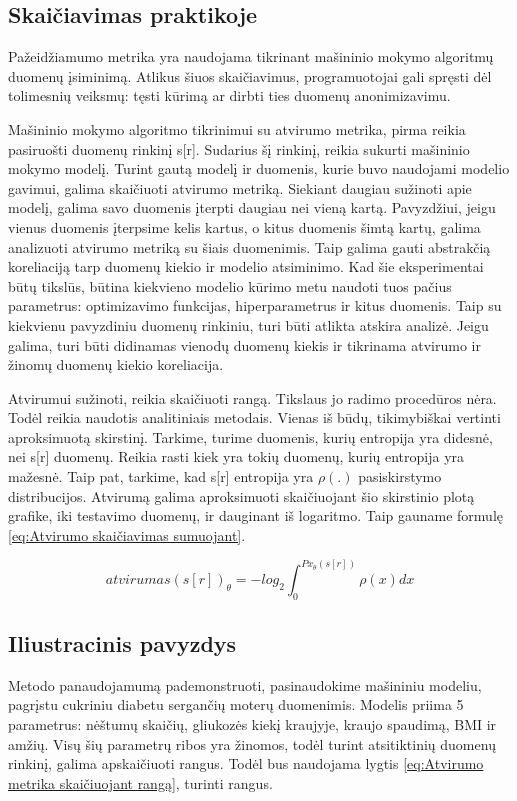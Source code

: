 \documentclass{VUMIFInfBakalaurinis}
\begin{document}
\subsection{Skaičiavimas praktikoje}
\par Pažeidžiamumo metrika  yra naudojama tikrinant mašininio mokymo algoritmų duomenų įsiminimą. Atlikus šiuos skaičiavimus, programuotojai gali spręsti dėl tolimesnių veiksmų: tęsti kūrimą ar dirbti ties duomenų anonimizavimu.
\par Mašininio mokymo algoritmo tikrinimui su atvirumo metrika, pirma reikia pasiruošti duomenų rinkinį s[r]. Sudarius šį rinkinį, reikia sukurti mašininio mokymo modelį. Turint gautą modelį ir duomenis, kurie buvo naudojami modelio gavimui, galima skaičiuoti atvirumo metriką. Siekiant daugiau sužinoti apie modelį, galima savo duomenis įterpti daugiau nei vieną kartą. Pavyzdžiui, jeigu vienus duomenis įterpsime kelis kartus, o kitus duomenis šimtą kartų, galima analizuoti atvirumo metriką su šiais duomenimis. Taip galima gauti abstrakčią koreliaciją tarp duomenų kiekio ir modelio atsiminimo. Kad šie eksperimentai būtų tikslūs, būtina kiekvieno modelio kūrimo metu naudoti tuos pačius parametrus: optimizavimo funkcijas, hiperparametrus ir kitus duomenis. Taip su kiekvienu pavyzdiniu duomenų rinkiniu, turi būti atlikta atskira analizė. Jeigu galima, turi būti didinamas vienodų duomenų kiekis ir tikrinama atvirumo ir žinomų duomenų kiekio koreliacija.
\par Atvirumui sužinoti, reikia skaičiuoti rangą. Tikslaus jo radimo procedūros nėra. Todėl reikia naudotis analitiniais metodais. Vienas iš būdų, tikimybiškai vertinti aproksimuotą skirstinį. Tarkime, turime duomenis, kurių entropija yra didesnė, nei s[r] duomenų. Reikia rasti kiek yra tokių duomenų, kurių entropija yra mažesnė. Taip pat, tarkime, kad s[r] entropija yra $\rho(.)$ pasiskirstymo distribucijos. Atvirumą galima aproksimuoti skaičiuojant šio skirstinio plotą grafike, iki testavimo duomenų, ir dauginant iš logaritmo.
Taip gauname formulę \eqref{eq:Atvirumo skaičiavimas sumuojant}.

\begin{equation}
atvirumas(s[r])_{\theta} = -log_{2} \int_{0}^{Px_{\theta}(s[r])} \rho(x)dx
\label{eq:Atvirumo skaičiavimas sumuojant}
\end{equation}

\subsection{Iliustracinis pavyzdys}
\par Metodo panaudojamumą pademonstruoti, pasinaudokime mašininiu modeliu, pagrįstu cukriniu diabetu sergančių moterų duomenimis. Modelis priima 5 parametrus: nėštumų skaičių, gliukozės kiekį kraujyje, kraujo spaudimą, BMI ir amžių. Visų šių parametrų ribos yra žinomos, todėl turint atsitiktinių duomenų rinkinį, galima apskaičiuoti rangus. Todėl bus naudojama lygtis \eqref{eq:Atvirumo metrika skaičiuojant rangą}, turinti rangus.
\end{document}
